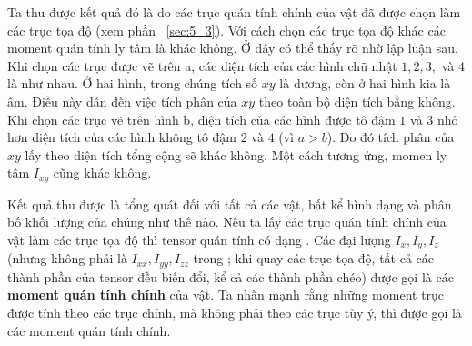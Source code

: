 Ta thu được kết quả đó là do các trục quán tính chính của vật đã được chọn làm các trục tọa độ (xem phần ~\ref{sec:5_3}). Với cách chọn các trục tọa độ khác các moment quán tính ly tâm là khác không. Ở đây có thể thấy rõ nhờ lập luận sau. Khi chọn các trục được vẽ trên a, các diện tích của các hình chữ nhật $1, 2, 3,$ và $4$ là như nhau. Ở hai hình, trong chúng tích số $xy$ là dương, còn ở hai hình kia là âm. Điều này dẫn đến việc tích phân của $xy$ theo toàn bộ diện tích bằng không. Khi chọn các trục vẽ trên hình b, diện tích của các hình được tô đậm $1$ và $3$ nhỏ hơn diện tích của các hình không tô đậm $2$ và $4$ (vì $a>b$). Do đó tích phân của $xy$ lấy theo diện tích tổng cộng sẽ khác không. Một cách tương ứng, momen ly tâm $I_{xy}$ cũng khác không.

Kết quả thu được là tổng quát đối với tất cả các vật, bất kể hình dạng và phân bố khối lượng của chúng như thế nào. Nếu ta lấy các trục quán tính chính của vật làm các trục tọa độ thì tensor quán tính có dạng . Các đại lượng $I_x, I_y, I_z$ (nhưng không phải là $I_{xx}, I_{yy}, I_{zz}$ trong ; khi quay các trục tọa độ, tất cả các thành phần của tensor đều biến đổi, kể cả các thành phần chéo) được gọi là các \textbf{moment quán tính chính} của vật. Ta nhấn mạnh rằng những moment trục được tính theo các trục chính, mà không phải theo các trục tùy ý, thì được gọi là các moment quán tính chính.


